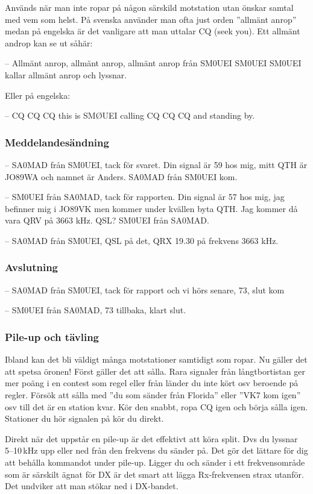 Används när man inte ropar på någon särskild motstation utan önskar samtal med
vem som helst. På svenska använder man ofta just orden ''allmänt anrop'' medan
på engelska är det vanligare att man uttalar CQ (seek you). Ett allmänt androp
kan se ut såhär:

-- Allmänt anrop, allmänt anrop, allmänt anrop från SM0UEI SM0UEI SM0UEI kallar
allmänt anrop och lyssnar.

Eller på engelska:

-- CQ CQ CQ this is SMØUEI calling CQ CQ CQ and standing by.

\subsubsection{Meddelandesändning}

-- SA0MAD från SM0UEI, tack för svaret. Din signal är 59 hos mig, mitt QTH är
JO89WA och namnet är Anders. SA0MAD från SM0UEI kom.

-- SM0UEI från SA0MAD, tack för rapporten. Din signal är 57 hos mig, jag
befinner mig i JO89VK men kommer under kvällen byta QTH. Jag kommer då vara QRV
på 3663 kHz. QSL? SM0UEI från SA0MAD.

-- SA0MAD från SM0UEI, QSL på det, QRX 19.30 på frekvens 3663 kHz.

\subsubsection{Avslutning}

-- SA0MAD från SM0UEI, tack för rapport och vi hörs senare, 73, slut kom

-- SM0UEI från SA0MAD, 73 tillbaka, klart slut.

\subsubsection{Pile-up och tävling}

Ibland kan det bli väldigt många motstationer samtidigt som ropar. Nu
gäller det att spetsa öronen! Först gäller det att sålla. Rara
signaler från långtbortistan ger mer poäng i en contest som regel
eller från länder du inte kört osv beroende på regler. Försök att
sålla med ''du som sänder från Florida'' eller ''VK7 kom igen'' osv
till det är en station kvar. Kör den snabbt, ropa CQ igen och börja
sålla igen. Stationer du hör signalen på kör du direkt.

Direkt när det uppstår en pile-up är det effektivt att köra split. Dvs
du lyssnar 5--10\,kHz upp eller ned från den frekvens du sänder
på. Det gör det lättare för dig att behålla kommandot under
pile-up. Ligger du och sänder i ett frekvensområde som är särskilt
ägnat för DX är det smart att lägga Rx-frekvensen strax utanför. Det
undviker att man stökar ned i DX-bandet.

